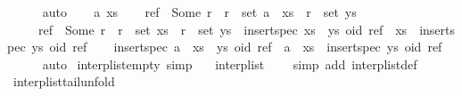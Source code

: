\begin{isabellebody}
\ \ \ \ \isamarkupfalse%
\ auto\isanewline
{}\isamarkupfalse%
\isanewline
\ \ \isamarkupfalse%
\ a\ xs\isanewline
\ \ \isamarkupfalse%
\ {\isachardoublequoteopen}ref\ {\isacharequal}\ Some\ r{\isachardoublequoteclose}\ \ {\isachardoublequoteopen}r\ {\isasymnotin}\ set\ {\isacharparenleft}a\ {\isacharhash}\ xs{\isacharparenright}{\isachardoublequoteclose}\ \ {\isachardoublequoteopen}r\ {\isasymin}\ set\ ys{\isachardoublequoteclose}\isanewline
\ \ \ \ \ {\isachardoublequoteopen}ref\ {\isacharequal}\ Some\ r\ {\isasymLongrightarrow}\ r\ {\isasymnotin}\ set\ xs\ {\isasymLongrightarrow}\ r\ {\isasymin}\ set\ ys\ {\isasymLongrightarrow}\ insert{\isacharunderscore}spec\ {\isacharparenleft}xs\ {\isacharat}\ ys{\isacharparenright}\ {\isacharparenleft}oid{\isacharcomma}\ ref{\isacharparenright}\ {\isacharequal}\ xs\ {\isacharat}\ insert{\isacharunderscore}spec\ ys\ {\isacharparenleft}oid{\isacharcomma}\ ref{\isacharparenright}{\isachardoublequoteclose}\isanewline
\ \ \isamarkupfalse%
\ {\isachardoublequoteopen}insert{\isacharunderscore}spec\ {\isacharparenleft}{\isacharparenleft}a\ {\isacharhash}\ xs{\isacharparenright}\ {\isacharat}\ ys{\isacharparenright}\ {\isacharparenleft}oid{\isacharcomma}\ ref{\isacharparenright}\ {\isacharequal}\ {\isacharparenleft}a\ {\isacharhash}\ xs{\isacharparenright}\ {\isacharat}\ insert{\isacharunderscore}spec\ ys\ {\isacharparenleft}oid{\isacharcomma}\ ref{\isacharparenright}{\isachardoublequoteclose}\isanewline
\ \ \ \ \isamarkupfalse%
\ auto\isanewline
{}\isamarkupfalse%
%
\endisatagproof
{\isafoldproof}%
%
\isadelimproof
%
\endisadelimproof
%
\isamarkuptrue%
\isamarkupfalse%
\ interp{\isacharunderscore}list{\isacharunderscore}empty\ {\isacharbrackleft}simp{\isacharbrackright}{\isacharcolon}\isanewline
\ \ \ {\isachardoublequoteopen}interp{\isacharunderscore}list\ {\isacharbrackleft}{\isacharbrackright}\ {\isacharequal}\ {\isacharbrackleft}{\isacharbrackright}{\isachardoublequoteclose}\isanewline
%
\isadelimproof
%
\endisadelimproof
%
\isatagproof
{}\isamarkupfalse%
\ {\isacharparenleft}simp\ add{\isacharcolon}\ interp{\isacharunderscore}list{\isacharunderscore}def{\isacharparenright}%
\endisatagproof
{\isafoldproof}%
%
\isadelimproof
\isanewline
%
\endisadelimproof
\isanewline
{}\isamarkupfalse%
\ interp{\isacharunderscore}list{\isacharunderscore}tail{\isacharunderscore}unfold{\isacharcolon}\isanewline

\end{isabellebody}
